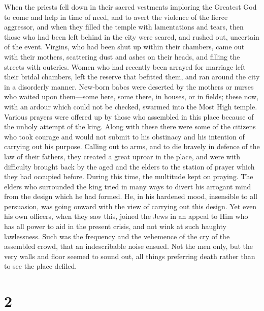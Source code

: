  When the priests fell down in their sacred vestments
imploring the Greatest God to come and help in time of need, and to
avert the violence of the fierce aggressor, and when they filled the
temple with lamentations and tears,  then those who had
been left behind in the city were scared, and rushed out, uncertain of
the event.  Virgins, who had been shut up within their
chambers, came out with their mothers, scattering dust and ashes on
their heads, and filling the streets with outcries.  Women
who had recently been arrayed for marriage left their bridal chambers,
left the reserve that befitted them, and ran around the city in a
disorderly manner.  New-born babes were deserted by the
mothers or nurses who waited upon them---some here, some there, in
houses, or in fields; these now, with an ardour which could not be
checked, swarmed into the Most High temple.  Various
prayers were offered up by those who assembled in this place because of
the unholy attempt of the king.  Along with these there
were some of the citizens who took courage and would not submit to his
obstinacy and his intention of carrying out his purpose. 
Calling out to arms, and to die bravely in defence of the law of their
fathers, they created a great uproar in the place, and were with
difficulty brought back by the aged and the elders to the station of
prayer which they had occupied before.  During this time,
the multitude kept on praying.  The elders who surrounded
the king tried in many ways to divert his arrogant mind from the design
which he had formed.  He, in his hardened mood, insensible
to all persuasion, was going onward with the view of carrying out this
design.  Yet even his own officers, when they saw this,
joined the Jews in an appeal to Him who has all power to aid in the
present crisis, and not wink at such haughty lawlessness. 
Such was the frequency and the vehemence of the cry of the assembled
crowd, that an indescribable noise ensued.  Not the men
only, but the very walls and floor seemed to sound out, all things
preferring death rather than to see the place defiled.

\hypertarget{section-1}{%
\section{2}\label{section-1}}

